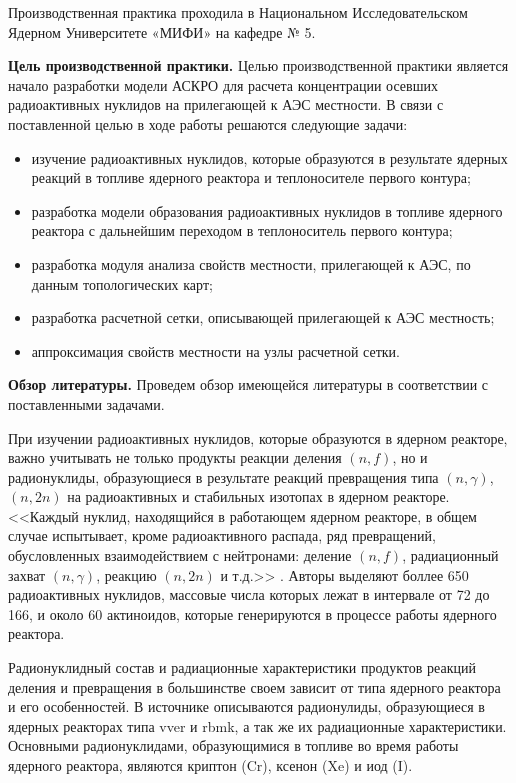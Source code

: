 
Производственная практика проходила в Национальном Исследовательском Ядерном Университете «МИФИ» на кафедре № 5. 

\textbf{Цель производственной практики.} Целью производственной практики является начало разработки модели АСКРО для
расчета концентрации осевших радиоактивных нуклидов на прилегающей к АЭС местности. В связи с поставленной целью в 
ходе работы решаются следующие задачи:

\begin{itemize}
	\item изучение радиоактивных нуклидов, которые образуются в результате ядерных реакций в топливе ядерного реактора 
		и теплоносителе первого контура;
	\item разработка модели образования радиоактивных нуклидов в топливе ядерного реактора с дальнейшим переходом в
		теплоноситель первого контура;
	\item разработка модуля анализа свойств местности, прилегающей к АЭС, по данным топологических карт;
	\item разработка расчетной сетки, описывающей прилегающей к АЭС местность;
	\item аппроксимация свойств местности на узлы расчетной сетки.
\end{itemize}

\textbf{Обзор литературы.} Проведем обзор имеющейся литературы в соответствии с поставленными задачами.

При изучении радиоактивных нуклидов, которые образуются в ядерном реакторе, важно учитывать не только продукты реакции 
деления $(n, f)$, но и радионуклиды, образующиеся в результате реакций превращения типа $(n, \gamma)$, $(n, 2n)$ на 
радиоактивных и стабильных изотопах в ядерном реакторе. <<Каждый нуклид, находящийся в работающем ядерном реакторе, в 
общем случае испытывает, кроме радиоактивного распада, ряд превращений, обусловленных взаимодействием с нейтронами: 
деление $(n, f)$, радиационный захват $(n, \gamma)$, реакцию $(n, 2n)$ и т.д.>> \citep[с.~6]{kolobashkin}.  
Авторы \cite{kolobashkin} выделяют боллее 650 радиоактивных нуклидов, массовые числа которых лежат в интервале от 72 до 
166, и около 60 актиноидов, которые генерируются в процессе работы ядерного реактора.

Радионуклидный состав и радиационные характеристики продуктов реакций деления и превращения в большинстве своем зависит 
от типа ядерного реактора и его особенностей. В источнике \cite{gusev} описываются радионулиды, образующиеся в ядерных 
реакторах типа \ac{vver} и \ac{rbmk}, а так же их радиационные характеристики.  Основными радионуклидами, образующимися 
в топливе во время работы ядерного реактора, являются криптон (Cr), ксенон (Xe) и иод (I).